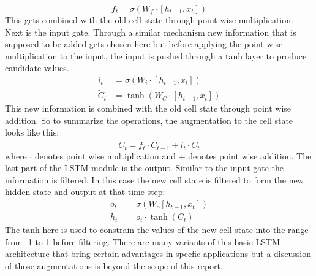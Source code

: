 \documentclass{article}
\begin{document}
\[
f_t = \sigma(W_f\cdot[h_{t-1}, x_t])
\]
This gets combined with the old cell state through point wise multiplication.
Next is the input gate. Through a similar mechanism new information that is supposed to be added gets chosen here but before applying the point wise multiplication to the input, the input is pushed through a tanh layer to produce candidate values. 
\[
\begin{split}
i_t &= \sigma(W_i\cdot[h_{t-1}, x_t])\\
\tilde{C}_t &= \tanh(W_C\cdot[h_{t-1},x_t])
\end{split}
\]
This new information is combined with the old cell state through point wise addition. So to summarize the operations, the augmentation to the cell state looks like this:
\[
C_t = f_t\cdot C_{t-1}+i_t\cdot \tilde{C}_t
\]
where \(\cdot\) denotes point wise multiplication and \(+\) denotes point wise addition. The last part of the LSTM module is the output. Similar to the input gate the information is filtered. In this case the new cell state is filtered to form the new hidden state and output at that time step:
\[
\begin{split}
o_t &= \sigma(W_o[h_{t-1}, x_t])\\
h_t &= o_t\cdot\tanh(C_t)
\end{split}
\]
The tanh here is used to constrain the values of the new cell state into the range from -1 to 1 before filtering. There are many variants of this basic LSTM architecture that bring certain advantages in specfic applications but a discussion of those augmentations is beyond the scope of this report.
\end{document}
